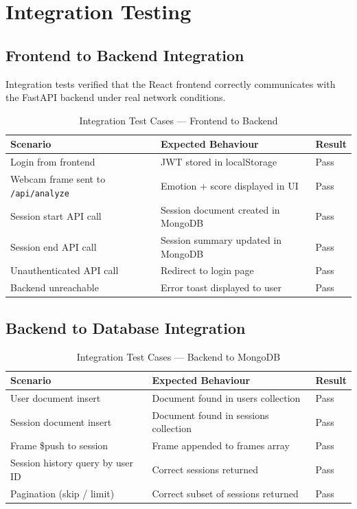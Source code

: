 \section{Integration Testing}

\subsection{Frontend to Backend Integration}

Integration tests verified that the React frontend correctly communicates
with the FastAPI backend under real network conditions.

\begin{table}[H]
\centering
\caption{Integration Test Cases — Frontend to Backend}
\begin{tabular}{p{} p{} l}
\toprule
\textbf{Scenario}                           & \textbf{Expected Behaviour}         & \textbf{Result} \\
\midrule
Login from frontend                         & JWT stored in localStorage          & Pass \\
Webcam frame sent to \texttt{/api/analyze}  & Emotion + score displayed in UI     & Pass \\
Session start API call                      & Session document created in MongoDB & Pass \\
Session end API call                        & Session summary updated in MongoDB  & Pass \\
Unauthenticated API call                    & Redirect to login page              & Pass \\
Backend unreachable                         & Error toast displayed to user       & Pass \\
\bottomrule
\end{tabular}
\end{table}

\subsection{Backend to Database Integration}

\begin{table}[H]
\centering
\caption{Integration Test Cases — Backend to MongoDB}
\begin{tabular}{p{} p{} l}
\toprule
\textbf{Scenario}                     & \textbf{Expected Behaviour}         & \textbf{Result} \\
\midrule
User document insert                  & Document found in users collection  & Pass \\
Session document insert               & Document found in sessions collection & Pass \\
Frame \$push to session               & Frame appended to frames array      & Pass \\
Session history query by user ID      & Correct sessions returned           & Pass \\
Pagination (skip / limit)             & Correct subset of sessions returned & Pass \\
\bottomrule
\end{tabular}
\end{table}

